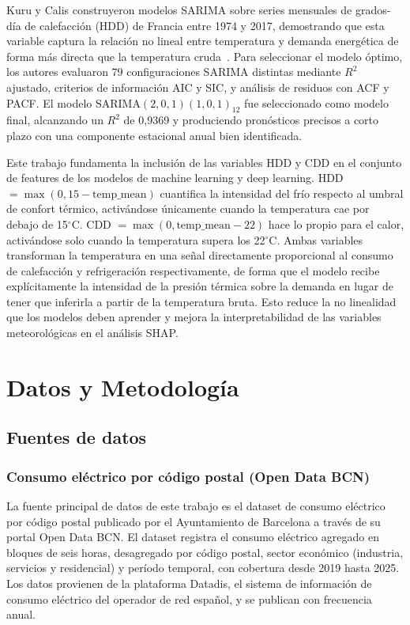\documentclass[12pt, a4paper]{article}
\begin{document}
Kuru y Calis construyeron modelos SARIMA sobre series mensuales de grados-día de calefacción (HDD) de Francia entre 1974 y 2017, demostrando que esta variable captura la relación no lineal entre temperatura y demanda energética de forma más directa que la temperatura cruda~\cite{kuru2019}. Para seleccionar el modelo óptimo, los autores evaluaron 79 configuraciones SARIMA distintas mediante $R^2$ ajustado, criterios de información AIC y SIC, y análisis de residuos con ACF y PACF. El modelo SARIMA$(2,0,1)(1,0,1)_{12}$ fue seleccionado como modelo final, alcanzando un $R^2$ de 0,9369 y produciendo pronósticos precisos a corto plazo con una componente estacional anual bien identificada.

Este trabajo fundamenta la inclusión de las variables HDD y CDD en el conjunto de features de los modelos de machine learning y deep learning. HDD $= \max(0, 15 - \text{temp\_mean})$ cuantifica la intensidad del frío respecto al umbral de confort térmico, activándose únicamente cuando la temperatura cae por debajo de 15$^\circ$C. CDD $= \max(0, \text{temp\_mean} - 22)$ hace lo propio para el calor, activándose solo cuando la temperatura supera los 22$^\circ$C. Ambas variables transforman la temperatura en una señal directamente proporcional al consumo de calefacción y refrigeración respectivamente, de forma que el modelo recibe explícitamente la intensidad de la presión térmica sobre la demanda en lugar de tener que inferirla a partir de la temperatura bruta. Esto reduce la no linealidad que los modelos deben aprender y mejora la interpretabilidad de las variables meteorológicas en el análisis SHAP.

\section{Datos y Metodología}

\subsection{Fuentes de datos}

\subsubsection{Consumo eléctrico por código postal (Open Data BCN)}

La fuente principal de datos de este trabajo es el dataset de consumo eléctrico por código postal publicado por el Ayuntamiento de Barcelona a través de su portal Open Data BCN. El dataset registra el consumo eléctrico agregado en bloques de seis horas, desagregado por código postal, sector económico (industria, servicios y residencial) y período temporal, con cobertura desde 2019 hasta 2025. Los datos provienen de la plataforma Datadis, el sistema de información de consumo eléctrico del operador de red español, y se publican con frecuencia anual.
\end{document}
